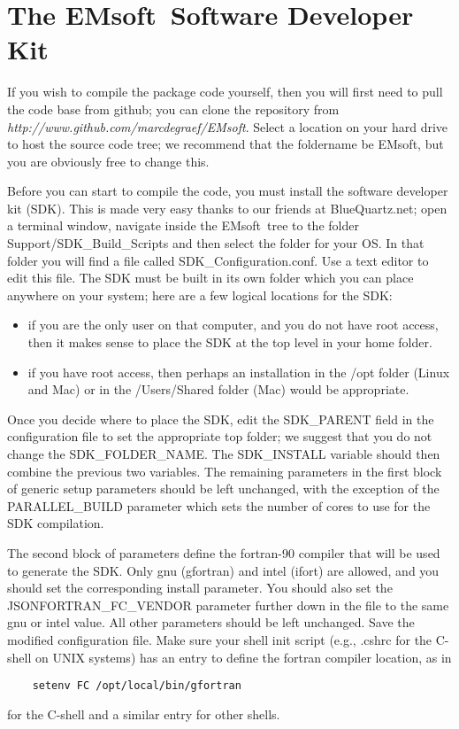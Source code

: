 \documentclass[DIV=calc, paper=letter, fontsize=11pt]{scrartcl}	 %
\newcommand{\ctp}{\textsf{EMsoft}}
\newcommand{\ctpb}{\textbf{\textsf{EMsoft}}}
\begin{document}
\section{The \ctpb\ Software Developer Kit\label{sec:SDK}}
If you wish to compile the package code yourself, then you will first need to pull the code base from github; you can 
clone the repository from \textit{http://www.github.com/marcdegraef/EMsoft}.  Select a location on your hard drive to 
host the source code tree; we recommend that the foldername be \ctp, but you are obviously free to change this.

Before you can start to compile the code, you must install the software developer kit (SDK).  This is made very easy thanks to our
friends at BlueQuartz.net; open a terminal window, navigate inside the \ctp\ tree to the folder \textsf{Support/SDK\_Build\_Scripts} and 
then select the folder for your OS.  In that folder you will find a file called \textsf{SDK\_Configuration.conf}.  Use a text editor to
edit this file.  The SDK must be built in its own folder which you can place anywhere on your system; here are a few logical 
locations for the SDK: 
\begin{itemize}
	\item if you are the only user on that computer, and you do not have root access, then it makes sense to place the SDK at the top level in your home folder.
	\item if you have root access, then perhaps an installation in the /opt folder (Linux and Mac) or in the /Users/Shared folder (Mac) would be appropriate.
\end{itemize}
Once you decide where to place the SDK, edit the \textsf{SDK\_PARENT} field in the configuration file to set the appropriate top folder; we
suggest that you do not change the \textsf{SDK\_FOLDER\_NAME}.  The \textsf{SDK\_INSTALL} variable should then combine the previous two
variables.  The remaining parameters in the first block of generic setup parameters should be left unchanged, with the exception of the \textsf{PARALLEL\_BUILD}
parameter which sets the number of cores to use for the SDK compilation.

The second block of parameters define the fortran-90 compiler that will be used to generate the SDK.  Only gnu (gfortran) and intel (ifort) 
are allowed, and you should set the corresponding install parameter.  You should also set the \textsf{JSONFORTRAN\_FC\_VENDOR}
parameter further down in the file to the same gnu or intel value.  All other parameters should be left unchanged.  Save the modified 
configuration file.  Make sure your shell init script (e.g., .cshrc for the C-shell on UNIX systems) has an entry to define the fortran compiler
location, as in 
\begin{verbatim}
	setenv FC /opt/local/bin/gfortran
\end{verbatim}
for the C-shell and a similar entry for other shells.
\end{document}
